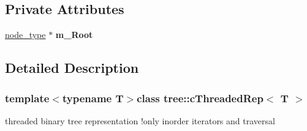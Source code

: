 \subsection*{Private Attributes}
\begin{DoxyCompactItemize}
\item 
\hypertarget{classtree_1_1cThreadedRep_ab973b2dff5006a341af704098731fe8e}{\hyperlink{structtree_1_1btree__threaded__node}{node\-\_\-type} $\ast$ {\bfseries m\-\_\-\-Root}}\label{classtree_1_1cThreadedRep_ab973b2dff5006a341af704098731fe8e}

\end{DoxyCompactItemize}


\subsection{Detailed Description}
\subsubsection*{template$<$typename T$>$class tree\-::c\-Threaded\-Rep$<$ T $>$}

threaded binary tree representation !only inorder iterators and traversal 

